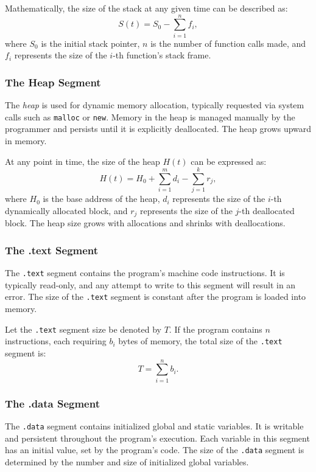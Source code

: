 Mathematically, the size of the stack at any given time can be described as:
\[
S(t) = S_0 - \sum_{i=1}^{n} f_i,
\]
where $S_0$ is the initial stack pointer, $n$ is the number of function calls made, and $f_i$ represents the size of the $i$-th function's stack frame.

\subsubsection{The Heap Segment}

The \emph{heap} is used for dynamic memory allocation, typically requested via system calls such as \texttt{malloc} or \texttt{new}. Memory in the heap is managed manually by the programmer and persists until it is explicitly deallocated. The heap grows upward in memory.

At any point in time, the size of the heap $H(t)$ can be expressed as:
\[
H(t) = H_0 + \sum_{i=1}^{m} d_i - \sum_{j=1}^{k} r_j,
\]
where $H_0$ is the base address of the heap, $d_i$ represents the size of the $i$-th dynamically allocated block, and $r_j$ represents the size of the $j$-th deallocated block. The heap size grows with allocations and shrinks with deallocations.

\subsubsection{The .text Segment}

The \texttt{.text} segment contains the program's machine code instructions. It is typically read-only, and any attempt to write to this segment will result in an error. The size of the \texttt{.text} segment is constant after the program is loaded into memory.

Let the \texttt{.text} segment size be denoted by $T$. If the program contains $n$ instructions, each requiring $b_i$ bytes of memory, the total size of the \texttt{.text} segment is:
\[
T = \sum_{i=1}^{n} b_i.
\]

\subsubsection{The .data Segment}

The \texttt{.data} segment contains initialized global and static variables. It is writable and persistent throughout the program's execution. Each variable in this segment has an initial value, set by the program's code. The size of the \texttt{.data} segment is determined by the number and size of initialized global variables.

